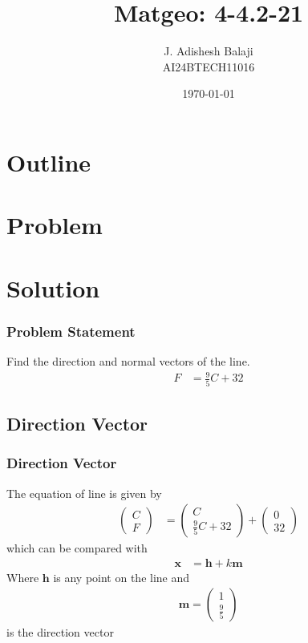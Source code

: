 \documentclass{beamer}
\title{Matgeo: 4-4.2-21}
\author{J. Adishesh Balaji \\ AI24BTECH11016}
\date{\today}
\theoremstyle{remark}
\newcommand{\myvec}[1]{\ensuremath{\begin{pmatrix}#1\end{pmatrix}}} %
\let\vec\mathbf %
\numberwithin{equation}{section}
\begin{document}
\begin{frame}
\titlepage
\end{frame}

\section*{Outline}
\begin{frame}
\tableofcontents
\end{frame}
\section{Problem}
\section{Solution}
\begin{frame}
\frametitle{Problem Statement}
%
Find the direction and normal vectors of the line.
\begin{align}
\label{eq:Line equation}
F &= \frac{9}{5} C + 32
\end{align}
\end{frame}


\subsection{Direction Vector}
\begin{frame}
\frametitle{Direction Vector}
The equation of line is given by \\
\begin{align}
\myvec{C \\ F} &= \myvec{C \\ \frac{9}{5}C+32} + \myvec{0 \\ 32} 
\end{align}
which can be compared with \\
        \begin{align}
            \vec{x} &= \vec{h} + k\vec{m}
        \end{align}
Where $\vec{h}$ is any point on the line and \\
        \begin{align}
        \label{eq:directionvec}
            \vec{m} = \myvec{1 \\ \frac{9}{5}}
        \end{align}
is the direction vector
\end{frame}
\end{document}
